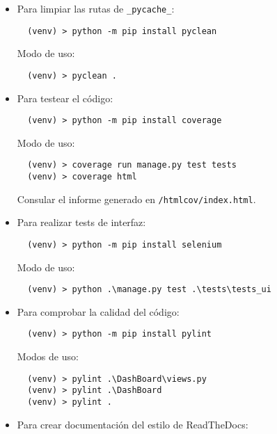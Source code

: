 \begin{itemize}

\item
Para limpiar las rutas de \texttt{\_pycache\_}:

\begin{verbatim}
  (venv) > python -m pip install pyclean
\end{verbatim}

Modo de uso:

\begin{verbatim}
  (venv) > pyclean .
\end{verbatim}

\item
Para testear el código:

\begin{verbatim}
  (venv) > python -m pip install coverage
\end{verbatim}

Modo de uso:

\begin{verbatim}
  (venv) > coverage run manage.py test tests
  (venv) > coverage html
\end{verbatim}


Consular el informe generado en \texttt{/htmlcov/index.html}.

\item
Para realizar tests de interfaz:

\begin{verbatim}
  (venv) > python -m pip install selenium 
\end{verbatim}

Modo de uso:
\begin{verbatim}
  (venv) > python .\manage.py test .\tests\tests_ui 
\end{verbatim}

\item
Para comprobar la calidad del código:

\begin{verbatim}
  (venv) > python -m pip install pylint
\end{verbatim}

Modos de uso:

\begin{verbatim}
  (venv) > pylint .\DashBoard\views.py
  (venv) > pylint .\DashBoard
  (venv) > pylint .
\end{verbatim}


\item
Para crear documentación del estilo de ReadTheDocs:


\end{itemize}
